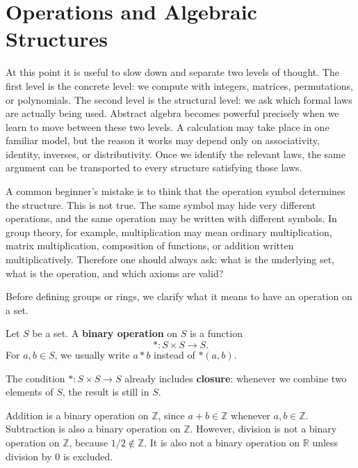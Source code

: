 \section{Operations and Algebraic Structures}


At this point it is useful to slow down and separate two levels of thought. The first level is the concrete level: we compute with integers, matrices, permutations, or polynomials. The second level is the structural level: we ask which formal laws are actually being used. Abstract algebra becomes powerful precisely when we learn to move between these two levels. A calculation may take place in one familiar model, but the reason it works may depend only on associativity, identity, inverses, or distributivity. Once we identify the relevant laws, the same argument can be transported to every structure satisfying those laws.

A common beginner's mistake is to think that the operation symbol determines the structure. This is not true. The same symbol may hide very different operations, and the same operation may be written with different symbols. In group theory, for example, multiplication may mean ordinary multiplication, matrix multiplication, composition of functions, or addition written multiplicatively. Therefore one should always ask: what is the underlying set, what is the operation, and which axioms are valid?

Before defining groups or rings, we clarify what it means to have an operation on a set.

\begin{definition}
Let $S$ be a set. A \textbf{binary operation} on $S$ is a function
\[
    *:S\times S\to S.
\]
For $a,b\in S$, we usually write $a*b$ instead of $*(a,b)$.
\end{definition}

The condition $*:S\times S\to S$ already includes \textbf{closure}: whenever we combine two elements of $S$, the result is still in $S$.

\begin{example}
Addition is a binary operation on $\mathbb{Z}$, since $a+b\in\mathbb{Z}$ whenever $a,b\in\mathbb{Z}$. Subtraction is also a binary operation on $\mathbb{Z}$. However, division is not a binary operation on $\mathbb{Z}$, because $1/2\notin\mathbb{Z}$. It is also not a binary operation on $\mathbb{R}$ unless division by $0$ is excluded.
\end{example}

